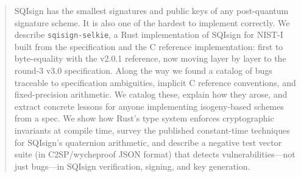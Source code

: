\begin{abstract}
SQIsign has the smallest signatures and public keys of any post-quantum
signature scheme.  It is also one of the hardest to implement correctly.
We describe \texttt{sqisign-selkie}, a Rust implementation of SQIsign
for NIST-I built from the specification and the C reference
implementation: first to byte-equality with the v2.0.1 reference, now
moving layer by layer to the round-3 v3.0 specification.
Along the way we found a catalog of bugs traceable to specification
ambiguities, implicit C reference conventions, and fixed-precision
arithmetic.  We catalog these, explain how they arose, and extract
concrete lessons for anyone implementing isogeny-based schemes from a
spec.  We show how Rust's type system
enforces cryptographic invariants at compile time, survey the
published constant-time techniques for SQIsign's quaternion arithmetic,
and describe a negative test vector suite (in C2SP/wycheproof JSON
format) that detects vulnerabilities---not just bugs---in SQIsign
verification, signing, and key generation.
\end{abstract}
